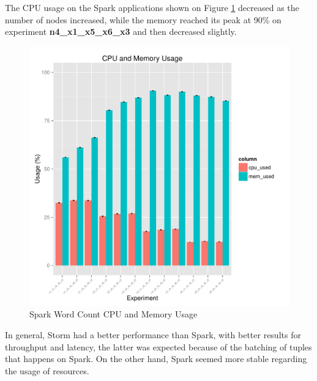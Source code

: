 \documentclass[ppgc,diss,english]{iiufrgs}
\begin{document}
The CPU usage on the Spark applications shown on Figure \ref{fig:spark_wordcount_cpu_mem} decreased as the number of nodes increased, while the memory reached its peak at 90\% on experiment \textbf{n4\_x1\_x5\_x6\_x3} and then decreased slightly.

\begin{figure}[H]
    \centering
	\includegraphics[width=.6\textwidth]{summaries/spark_wordcount/cpu_mem.pdf}
	\caption{Spark Word Count CPU and Memory Usage}
	\label{fig:spark_wordcount_cpu_mem}
\end{figure}

In general, Storm had a better performance than Spark, with better results for throughput and latency, the latter was expected because of the batching of tuples that happens on Spark. On the other hand, Spark seemed more stable regarding the usage of resources.
\end{document}
